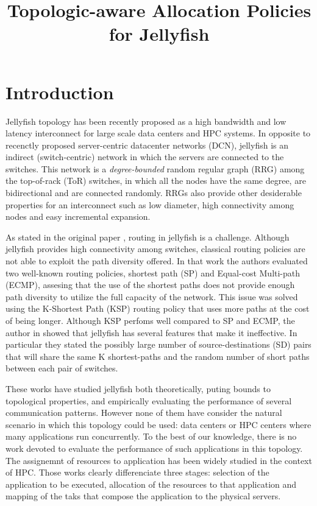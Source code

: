 \documentclass{sig-alternate}
\title{Topologic-aware Allocation Policies for Jellyfish }
\begin{document}
\maketitle
\thispagestyle{firstpage}
\pagestyle{plain}

\begin{abstract}



\end{abstract}

\section{Introduction}
\label{introduction}

Jellyfish topology \cite{jellyfish} has been recently proposed as a high bandwidth and low latency interconnect for large scale data centers and HPC systems. In opposite to recenctly proposed server-centric datacenter networks (DCN), jellyfish is an indirect (switch-centric) network in which the servers are connected to the switches. This network is a \textit{degree-bounded} random regular graph (RRG) among the top-of-rack (ToR) switches, in which all the nodes have the same degree, are bidirectional and are connected randomly. RRGs also provide other desiderable properties for an interconnect such as low diameter, high connectivity among nodes and easy incremental expansion.

As stated in the original paper \cite{jellyfish}, routing in jellyfish is a challenge. Although jellyfish provides high connectivity among switches, classical routing policies are not able to exploit the path diversity offered. In that work the authors evaluated two well-known routing policies, shortest path (SP) and Equal-cost Multi-path (ECMP), assesing that the use of the shortest paths does not provide enough path diversity to utilize the full capacity of the network. This issue was solved using the K-Shortest Path (KSP) \cite{yen} routing policy that uses more paths at the cost of being longer. Although KSP perfoms well compared to SP and ECMP, the author in \cite{llksp} showed that jellyfish has several features that make it ineffective. In particular they stated the possibly large number of source-destinations (SD) pairs that will share the same K shortest-paths and the random number of short paths between each pair of switches. 

These works have studied jellyfish both theoretically, puting bounds to topological properties, and empirically evaluating the performance of several communication patterns. However none of them have consider the natural scenario in which this topology could be used: data centers or HPC centers where many applications run concurrently. To the best of our knowledge, there is no work devoted to evaluate the performance of such applications in this topology. The assignemnt of resources to application has been widely studied in the context of HPC. Those works clearly differenciate three stages: selection of the application to be executed, allocation of the resources to that application and mapping of the taks that compose the application to the physical servers. 
\end{document}
